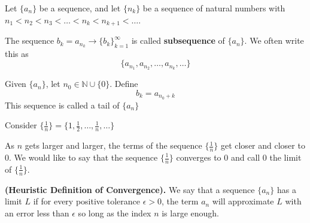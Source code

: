 
\begin{defn}
Let $\{a_n\}$ be a sequence, and let $\{n_k\}$ be a sequence of natural numbers with $n_1<n_2<n_3<\dots<n_k<n_{k+1}<\dots$.

The sequence $b_k = a_{n_k}\to \{b_k\}_{k=1}^\infty$ is called \textbf{subsequence} of $\{a_n\}$. We often write this as 
$$\{a_{n_1},a_{n_2},\dots,a_{n_k},\dots\}$$
\end{defn}

Given $\{a_n\}$, let $n_0 \in \mathbb{N} \cup \{0\}$.
Define $$b_k = a_{n_0+k}$$
This sequence is called a tail of $\{a_n\}$

Consider $\{\frac{1}{n}\}=\{1,\frac{1}{2},\dots,\frac{1}{n},\dots\}$

\begin{note}
As $n$ gets larger and larger, the terms of the sequence $\{\frac{1}{n}\}$ get closer and closer to 0. We would like to say that the sequence $\{\frac{1}{n}\}$ converges to 0 and call 0 the limit of $\{\frac{1}{n}\}$.
\end{note}


\begin{defn}
\textbf{(Heuristic Definition of Convergence).} We say that a sequence $\{a_n\}$ has a limit $L$ if for every positive tolerance $\epsilon > 0$, the term $a_n$ will approximate $L$ with an error less than $\epsilon$ so long as the index $n$ is large enough.
\end{defn}





